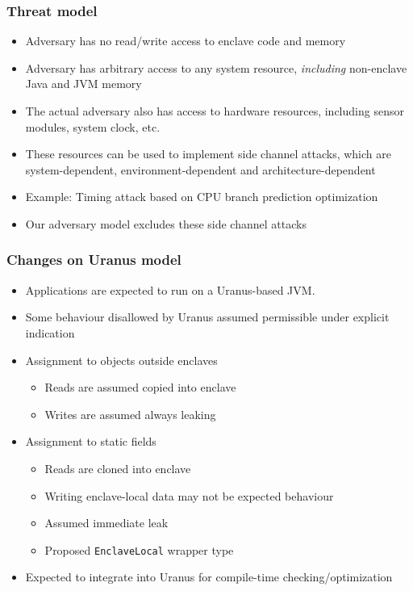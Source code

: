 \documentclass{beamer}
\newcommand{\code}[1]{\colorbox{code}{\texttt{\footnotesize #1}}}
\begin{document}
\begin{frame}
  \frametitle{Threat model}
  \begin{itemize}
    \item Adversary has no read/write access to enclave code and memory
    \item Adversary has arbitrary access to any system resource,
      \emph{including} non-enclave Java and JVM memory
    \item The actual adversary also has access to hardware resources,
      including sensor modules, system clock, etc.
    \item These resources can be used to implement side channel attacks,
      which are system-dependent, environment-dependent and architecture-dependent
    \item Example: Timing attack based on CPU branch prediction optimization
    \item Our adversary model excludes these side channel attacks
  \end{itemize}
\end{frame}

\begin{frame}
  \frametitle{Changes on Uranus model}
  \begin{itemize}
    \item Applications are expected to run on a Uranus-based JVM.
    \item Some behaviour disallowed by Uranus assumed permissible under explicit indication
    \item Assignment to objects outside enclaves
      \begin{itemize}
        \item Reads are assumed copied into enclave
        \item Writes are assumed always leaking
      \end{itemize}
    \item Assignment to static fields
      \begin{itemize}
        \item Reads are cloned into enclave
        \item Writing enclave-local data may not be expected behaviour
        \item Assumed immediate leak
        \item Proposed \code{EnclaveLocal} wrapper type
      \end{itemize}
    \item Expected to integrate into Uranus for compile-time checking/optimization
  \end{itemize}
\end{frame}
\end{document}
